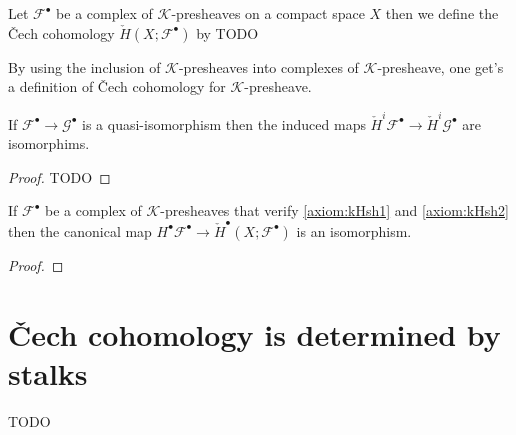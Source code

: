 
\section{}

\begin{definition}\label{def:chech_of_compelx_of_k_prsh}
    Let $\mathcal{F}^{\bullet}$ be a complex of $\mathcal{K}$-presheaves on a compact space $X$ then we define the \v{C}ech cohomology $\check{H}(X;\mathcal{F}^{\bullet})$ by TODO
\end{definition}

\begin{remark}\label{def:chech_of_k_prsh}
    By using the inclusion of $\mathcal{K}$-presheaves into complexes of $\mathcal{K}$-presheave, one get's a definition of \v{C}ech cohomology for $\mathcal{K}$-presheave.
\end{remark}

\begin{lemma}\label{lem:chech_preserve_quasi_iso}
    If $\mathcal{F}^{\bullet}\to\mathcal{G}^{\bullet}$ is a quasi-isomorphism then the induced maps $\check{H}^i\mathcal{F}^{\bullet}\to \check{H}^i\mathcal{G}^{\bullet}$ are isomorphims.
\end{lemma}

\begin{proof}
    TODO
\end{proof}

\begin{proposition}\label{prop:homotopy_k_sheaf_compute_chech}
    If $\mathcal{F}^{\bullet}$ be a complex of $\mathcal{K}$-presheaves that verify \ref{axiom:kHsh1} and \ref{axiom:kHsh2} then the canonical map $H^{\bullet}\mathcal{F}^{\bullet}\to \check{H}^{\bullet}(X;\mathcal{F}^{\bullet})$ is an isomorphism.
\end{proposition}

\begin{proof}

\end{proof}

\section{\v{C}ech cohomology is determined by stalks}

\begin{lemma}\label{lem:chech_is_determined_by_stalks_1}
    TODO
\end{lemma}

